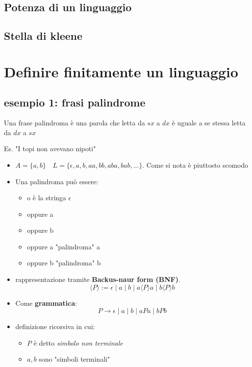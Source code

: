 \subsection{Potenza di un linguaggio}

\subsection{Stella di kleene}

\section{Definire finitamente un linguaggio}
\subsection{esempio 1: frasi palindrome}
Una frase palindroma è una parola che letta da $sx$ a $dx$ è uguale a se stessa letta da $dx$ a $sx$

Es. "I topi non avevano nipoti"
\begin{itemize}
    \item $A=\{a,b\} \quad L=\{\epsilon, a, b, aa, bb, aba, bab, \dots\}$. Come si nota è piuttosto scomodo
\item Una palindroma può essere: 
        \begin{itemize}
            \item o è la stringa $\epsilon$
            \item oppure a
            \item oppure b
            \item oppure a "palindroma" a
            \item oppure b "palindroma" b
        \end{itemize} 
    \item rappresentazione tramite \textbf{Backus-naur form (BNF)}.
    \[
         \langle P \rangle := \epsilon \mid a\mid b\mid a \langle P \rangle a\mid b \langle P \rangle b   
    \]
    \item  Come \textbf{grammatica}:
    \[
        P\to \epsilon \mid a\mid b\mid aPa\mid bPb    
    \]
    \item definizione ricorsiva in cui:
    \begin{itemize}
        \item $P$ è detto \textit{simbolo non terminale}
        \item $a,b$ sono "simboli terminali"
    \end{itemize}
\end{itemize}
